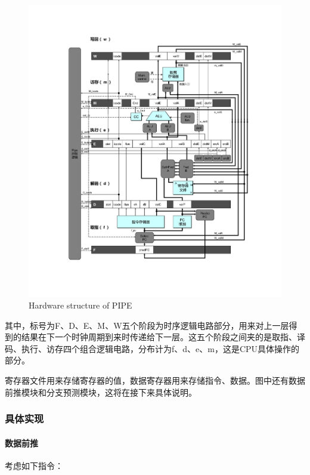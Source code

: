 \documentclass[12pt]{article}
\begin{document}
\begin{CJK*}{GB}{gbsn}
\begin{figure}[htbp]
\centering
\includegraphics{img/pipe-full.png}
\caption{Hardware structure of PIPE}
\end{figure}

其中，标号为F、D、E、M、W五个阶段为时序逻辑电路部分，用来对上一层得到的结果在下一个时钟周期到来时传递给下一层。这五个阶段之间夹的是取指、译码、执行、访存四个组合逻辑电路，分布计为f、d、e、m，这是CPU具体操作的部分。

寄存器文件用来存储寄存器的值，数据寄存器用来存储指令、数据。图中还有数据前推模块和分支预测模块，这将在接下来具体说明。

\subsubsection{具体实现}\label{ux5177ux4f53ux5b9eux73b0}

\paragraph{数据前推}\label{ux6570ux636eux524dux63a8}

考虑如下指令：


\end{CJK*}
\end{document}

